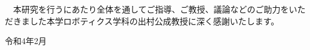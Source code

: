 
　本研究を行うにあたり全体を通してご指導、ご教授、議論などのご助力をいただきました本学ロボティクス学科の出村公成教授に深く感謝いたします。

\begin{flushright}
令和4年2月
\end{flushright}
